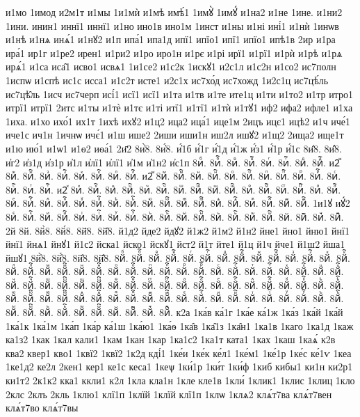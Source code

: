 {и1мо
1имод
и2м1т
и1мы
1и1мѝ
и1мѣ
имѣ́1
1имꙋ̀
1имꙋ́
и1на2
и1не
1ине.
и1ни2
1ини.
инин1
иннї1
иннї1
и1но
ино1в
ино1м
1инст
и1ны
и1ні
ині́1
и1нѝ
1инѡв
и1нѣ
и1нѧ
инѧ́1
и1нꙋ2
и1п
ипа́1
ипа1д
ипї1
ипїо1
ипї1
ипїо1
ипѣ1в
2ир
и1ра
ира́1
ир1г
и1ре2
ирен1
и1ри2
и1ро
иро1н
и1рє
и1рі
ирї1
и1рї1
и1рѝ
и1рѣ
и1рѧ
ирѧ́1
и1са
иса̑1
исво1
исвѧ1
1и1се2
и1с2к
1искꙋ1
и2с1л
и1с2н
и1со2
ис7полн
1испѡ
и1спѣ
ис1с
исса1
и1с2т
исте1
и2с1х
ис7хо́д
ис7хожд
1и2с1ц
ис7цѣ́ль
ис7цѣ̑ль
1исч
ис7черп
исі́1
исї1
исї1
и1та
и1тв
и1те
ите1ц
и1ти
и1то2
и1тр
итро1
итрї1
итрї1
2итс
и1ты
и1тѐ
и1тє
и1ті
итї1
и1тї1
и1тѝ
и1тꙋ1
иф2
ифа2
ифле1
и1ха
1иха.
и1хо
ихо́1
их1т
1ихѣ
ихꙋ2
и1ц2
ица2
ица́1
ице1м
2ицъ
ицє1
ицѣ2
и1ч
иче́1
иче1с
ич1н
1ичнѡ
ичє́1
и1ш
ише2
2иши
иши1н
иш2л
ишꙋ2
и1щ2
2ища2
ище1т
и1ю
ию́1
и1ѡ1
и1ѳ2
иѳа́1
2и҃2
8и҆̀8.
8и҆́8.
и҆́1б
и҆́1г
и҆́1д
и҆́1ж
и҆́з1
и҆́1р
и҆́1с
8и҆̈8.
8и҆̑8.
и҆г2
и҆з1д
и҆з1р
и҆1л
и҆лї1
и҆лї1
и҆1м
и҆1н2
и҆с1п
8иⷠ.
8иⷠ҇.
8иⷡ.
8иⷡ҇.
8иⷢ.
8иⷢ҇.
8иⷣ.
8иⷣ҇.
и2ⷤ
8иⷤ.
8иⷤ҇.
8иⷥ.
8иⷥ҇.
8иⷦ.
8иⷦ҇.
8иⷧ.
8иⷧ҇.
и2ⷨ
8иⷨ.
8иⷨ҇.
8иⷩ.
8иⷩ҇.
8иⷪ.
8иⷪ҇.
8иⷫ.
8иⷫ҇.
8иⷬ.
8иⷬ҇.
8иⷭ.
8иⷭ҇.
8иⷮ.
8иⷮ҇.
и2ⷯ
8иⷯ.
8иⷯ҇.
8иⷰ.
8иⷰ҇.
8иⷱ.
8иⷱ҇.
8иⷲ.
8иⷲ҇.
8иⷳ.
8иⷳ҇.
8иⷴ.
8иⷴ҇.
8иⷵ.
8иⷵ҇.
8иⷶ.
8иⷶ҇.
8иⷷ.
8иⷷ҇.
8иⷸ.
8иⷸ҇.
8иⷹ.
8иⷹ҇.
8иⷺ.
8иⷺ҇.
8иⷻ.
8иⷻ҇.
8иⷼ.
8иⷼ҇.
8иⷽ.
8иⷽ҇.
8иⷾ.
8иⷾ҇.
8иⷿ.
8иⷿ҇.
1и1ꙋ
иꙋ́2
8иꙴ.
8иꙴ҇.
8иꙵ.
8иꙵ҇.
8иꙶ.
8иꙶ҇.
8иꙷ.
8иꙷ҇.
8иꙸ.
8иꙸ҇.
8иꙹ.
8иꙹ҇.
8иꙺ.
8иꙺ҇.
8иꙻ.
8иꙻ҇.
8и꙼.
8и꙼҇.
8и꙽.
8и꙽҇.
2й
8й.
8й̀8.
8й́8.
8й̈8.
8й̑8.
й1д2
йде2
йдꙋ2
й1ж2
й1м2
й1н2
йне1
йно1
йню1
йнї1
йнї1
йнѧ1
йнꙋ1
й1с2
йска1
йско1
йскꙋ1
йст2
й1т
йте1
й1ц
й1ч
йче1
й1ш2
йша1
йшꙋ1
8й҆̀8.
8й҆́8.
8й҆̈8.
8й҆̑8.
8йⷠ.
8йⷠ҇.
8йⷡ.
8йⷡ҇.
8йⷢ.
8йⷢ҇.
8йⷣ.
8йⷣ҇.
8йⷤ.
8йⷤ҇.
8йⷥ.
8йⷥ҇.
8йⷦ.
8йⷦ҇.
8йⷧ.
8йⷧ҇.
8йⷨ.
8йⷨ҇.
8йⷩ.
8йⷩ҇.
8йⷪ.
8йⷪ҇.
8йⷫ.
8йⷫ҇.
8йⷬ.
8йⷬ҇.
8йⷭ.
8йⷭ҇.
8йⷮ.
8йⷮ҇.
8йⷯ.
8йⷯ҇.
8йⷰ.
8йⷰ҇.
8йⷱ.
8йⷱ҇.
8йⷲ.
8йⷲ҇.
8йⷳ.
8йⷳ҇.
8йⷴ.
8йⷴ҇.
8йⷵ.
8йⷵ҇.
8йⷶ.
8йⷶ҇.
8йⷷ.
8йⷷ҇.
8йⷸ.
8йⷸ҇.
8йⷹ.
8йⷹ҇.
8йⷺ.
8йⷺ҇.
8йⷻ.
8йⷻ҇.
8йⷼ.
8йⷼ҇.
8йⷽ.
8йⷽ҇.
8йⷾ.
8йⷾ҇.
8йⷿ.
8йⷿ҇.
8йꙴ.
8йꙴ҇.
8йꙵ.
8йꙵ҇.
8йꙶ.
8йꙶ҇.
8йꙷ.
8йꙷ҇.
8йꙸ.
8йꙸ҇.
8йꙹ.
8йꙹ҇.
8йꙺ.
8йꙺ҇.
8йꙻ.
8йꙻ҇.
8й꙼.
8й꙼҇.
8й꙽.
8й꙽҇.
к2а
1ка́в
ка́1г
1ка́е
ка́1ж
1ка́з
1ка́й
1ка́й
1ка́1к
1ка́1м
1ка́п
1ка́р
ка́1ш
1ка́ю1
1ка́ѳ
1ка̑в
1ка̑1з
1ка̑н1
1ка1в
1каго
1ка1д
1каж
ка1з2
1как
1кал
кали1
1кам
1кан
1кар
1ка1с2
1ка1т
ката1
1ках
1каш
1каѧ́
к2в
ква2
квер1
кво1
1квї2
1квї2
1к2д
кді́1
1ке́и
1ке́к
ке́л1
1ке́м1
1ке́1р
1ке́с
ке́1ѵ
1кеа
1ке1д2
ке2л
2кен1
кер1
ке1с
кеса1
1кеѱ
1ки́1р
1ки́т
1ки́ф
1киб
кибы1
ки1н
ки2р1
ки1т2
2к1к2
кка1
ккли1
к2л
1кла
кла1н
1кле
кле1в
1кли́
1клик1
1клис
1клиц
1кло
2клс
2клъ
2кль
1клю1
клї1п
1клїй
1клїй
клї1п
1клѡ
1клѧ2
клѧ́т7ва
клѧ́т7вен
клѧ́т7во
клѧ́т7вы
}
